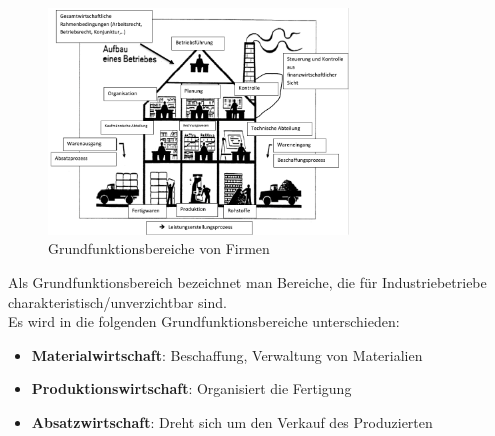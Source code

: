\documentclass[10pt]{article}
\begin{document}
\begin{figure}[H]
\begin{center}
  \includegraphics[height=6cm]{funktionsbereiche_firma.png}
  \end{center}
  \caption{Grundfunktionsbereiche von Firmen}
  \label{fig: Grundfunktionsbereiche von Firmen}
\end{figure}
Als Grundfunktionsbereich bezeichnet man Bereiche, die für Industriebetriebe charakteristisch/unverzichtbar sind. \\
Es wird in die folgenden Grundfunktionsbereiche unterschieden:
\begin{itemize}
\item \textbf{Materialwirtschaft}: Beschaffung, Verwaltung von  Materialien
\item \textbf{Produktionswirtschaft}: Organisiert die Fertigung
\item \textbf{Absatzwirtschaft}: Dreht sich um den Verkauf des Produzierten
\end{itemize}
\end{document}
